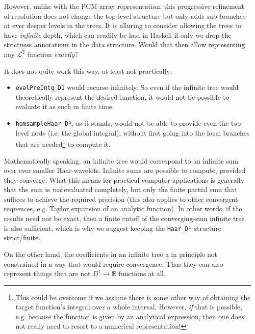 \documentclass[sigplan,screen]{acmart}
\theoremstyle{acmplain}
\theoremstyle{acmdefinition}
\begin{document}
However, unlike with the PCM array representation, this progressive refinement of resolution does not change the top-level structure but only adds sub-branches at ever deeper levels in the trees. It is alluring to consider allowing the trees to have \emph{infinite} depth, which can readily be had in Haskell if only we drop the strictness annotations in the data structure. Would that then allow representing any $\mathcal{L}^2$ function \emph{exactly}?

It does not quite work this way, at least not practically:
\begin{itemize}
 \item \verb`evalPreIntg_D1` would recurse infinitely. So even if the infinite tree would theoretically represent the desired function, it would not be possible to evaluate it as such in finite time.
 \item \verb`homsampleHaar_D¹`, as it stands, would not be able to provide even the top-level node (i.e. the global integral), without first going into the local branches that are needed\footnote{
This could be overcome if we assume there is some other way of obtaining the target function's integral over a whole interval. However, \emph{if} that is possible, e.g. because the function is given by an analytical expression, then one does not really need to resort to a numerical representation!} to compute it.
\end{itemize}
Mathematically speaking, an infinite tree would correspond to an infinite sum over ever smaller Haar-wavelets. Infinite sums are possible to compute, provided they converge. What this means for practical computer applications is generally that the sum is \emph{not} evaluated completely, but only the finite partial sum that suffices to achieve the required precision (this also applies to other convergent sequences, e.g. Taylor expansion of an analytic function).
In other words, if the results need not be exact, then a finite cutoff of the converging-sum infinite tree is also sufficient, which is why we suggest keeping the \verb`Haar_D¹` structure strict/finite.

On the other hand, the coefficients in an infinite tree a in principle not constrained in a way that would require convergence. Thus they can also represent things that are not $D^1\to \mathbb{R}$ functions at all.
\end{document}
